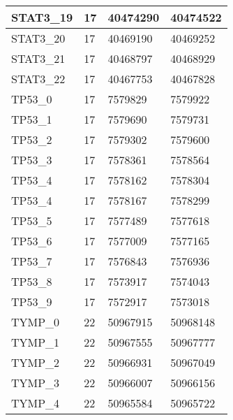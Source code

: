 \begin{longtable}{| p{} | C{.10\textwidth} | C{.35\textwidth} | C{.35\textwidth} |}
STAT3\_19               & 17           & 40474290              & 40474522            \\ \hline
STAT3\_20               & 17           & 40469190              & 40469252            \\ \hline
STAT3\_21               & 17           & 40468797              & 40468929            \\ \hline
STAT3\_22               & 17           & 40467753              & 40467828            \\ \hline
TP53\_0                 & 17           & 7579829               & 7579922             \\ \hline
TP53\_1                 & 17           & 7579690               & 7579731             \\ \hline
TP53\_2                 & 17           & 7579302               & 7579600             \\ \hline
TP53\_3                 & 17           & 7578361               & 7578564             \\ \hline
TP53\_4                 & 17           & 7578162               & 7578304             \\ \hline
TP53\_4                 & 17           & 7578167               & 7578299             \\ \hline
TP53\_5                 & 17           & 7577489               & 7577618             \\ \hline
TP53\_6                 & 17           & 7577009               & 7577165             \\ \hline
TP53\_7                 & 17           & 7576843               & 7576936             \\ \hline
TP53\_8                 & 17           & 7573917               & 7574043             \\ \hline
TP53\_9                 & 17           & 7572917               & 7573018             \\ \hline
TYMP\_0                 & 22           & 50967915              & 50968148            \\ \hline
TYMP\_1                 & 22           & 50967555              & 50967777            \\ \hline
TYMP\_2                 & 22           & 50966931              & 50967049            \\ \hline
TYMP\_3                 & 22           & 50966007              & 50966156            \\ \hline
TYMP\_4                 & 22           & 50965584              & 50965722            \\ \hline

\end{longtable}
